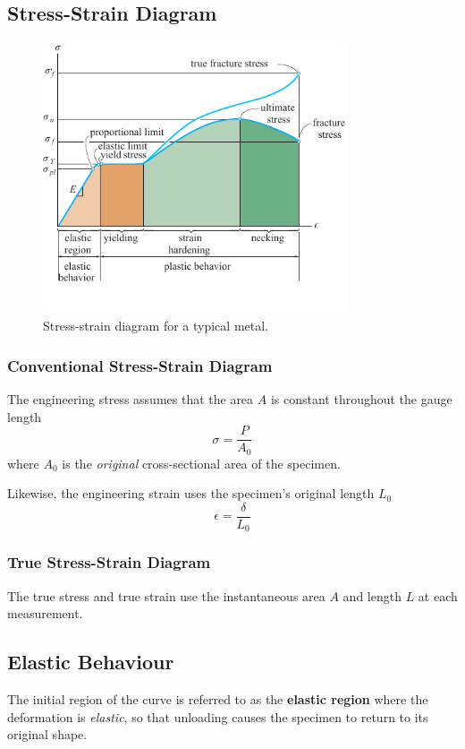 \documentclass{article}
\begin{document}
\subsection{Stress-Strain Diagram}
\begin{figure}[H]
    \centering
    \includegraphics[height = 8cm, keepaspectratio = true]{figures/stress_strain_diagram.pdf}
    \caption{Stress-strain diagram for a typical metal.}
\end{figure}
\subsubsection{Conventional Stress-Strain Diagram}
The engineering stress assumes that the area \(A\) is constant throughout
the gauge length
\begin{equation*}
    \sigma = \frac{P}{A_0}
\end{equation*}
where \(A_0\) is the \textit{original} cross-sectional area of the specimen.

Likewise, the engineering strain uses the specimen's original length \(L_0\)
\begin{equation*}
    \epsilon = \frac{\delta}{L_0}
\end{equation*}
\subsubsection{True Stress-Strain Diagram}
The true stress and true strain use the instantaneous area \(A\) and length \(L\)
at each measurement.
\subsection{Elastic Behaviour}
The initial region of the curve is referred to as the \textbf{elastic region}
where the deformation is \textit{elastic}, so that unloading causes
the specimen to return to its original shape.
\end{document}
